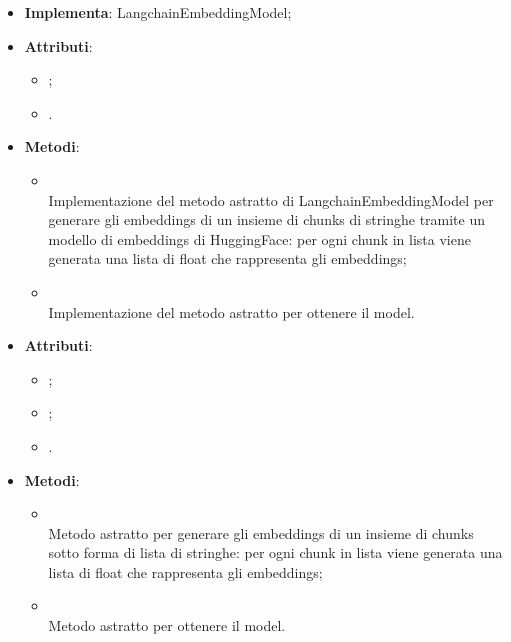 \documentclass[10pt, a4paper]{article}
\begin{document}
\label{HuggingFaceEmbeddingModelDettaglio}
\begin{itemize}
    \item \textbf{Implementa}: LangchainEmbeddingModel;
    \item \textbf{Attributi}:
    \begin{itemize}
        \item {};
        \item {}.
    \end{itemize}
    \item \textbf{Metodi}:
    \begin{itemize}
        \item {}\\
        Implementazione del metodo astratto di LangchainEmbeddingModel per generare gli embeddings di un insieme di chunks di stringhe tramite un modello di embeddings di HuggingFace: per ogni chunk in lista viene generata una lista di float che rappresenta gli embeddings;
        \item {}\\
        Implementazione del metodo astratto per ottenere il model.
    \end{itemize}
\end{itemize}


\label{LangchainDocumentDettaglio}
\begin{itemize}
    \item \textbf{Attributi}:
    \begin{itemize}
        \item {};
        \item {};
        \item {}.
    \end{itemize}
\end{itemize}

\label{LangchainEmbeddingModelDettaglio}
\begin{itemize}
    \item \textbf{Metodi}:
    \begin{itemize}
        \item {}\\
        Metodo astratto per generare gli embeddings di un insieme di chunks sotto forma di lista di stringhe: per ogni chunk in lista viene generata una lista di float che rappresenta gli embeddings;
        \item {}\\
        Metodo astratto per ottenere il model.
    \end{itemize}
\end{itemize}
\end{document}
